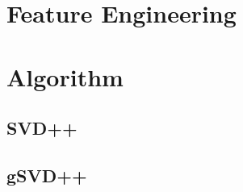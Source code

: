 \section{Feature Engineering}

\section{Algorithm}
\cite{rendle_factorization_2012}
\subsection{SVD++}
\cite{koren_factorization_2008}
\subsection{gSVD++}
\cite{manzato_gsvd++:_2013}

